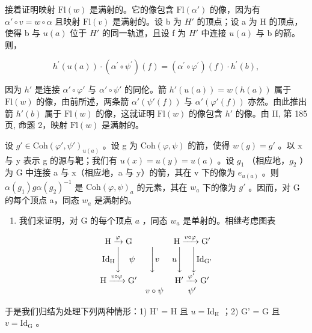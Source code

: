 接着证明映射 \(\mathrm{Fl}(w)\) 是满射的。它的像包含 \(\mathrm{Fl}(\alpha')\) 的像，因为有 \(\alpha'\circ v=w\circ\alpha\) 且映射 \(\mathrm{Fl}(v)\) 是满射的。设 b 为 \(H'\) 的顶点；设 a 为 H 的顶点，使得 b 与 \(u(a)\) 位于 \(H'\) 的同一轨道，且设 f 为 \(H'\) 中连接 \(u(a)\) 与 b 的箭。则，

\[
h ^ {\prime} (u (a)) \cdot (\alpha^ {\prime} \circ \psi^ {\prime}) (f) = (\alpha^ {\prime} \circ \varphi^ {\prime}) (f) \cdot h ^ {\prime} (b),
\]

因为 \(h'\) 是连接 \(\alpha' \circ \varphi'\) 与 \(\alpha' \circ \psi'\) 的同伦。箭 \(h'(u(a)) = w(h(a))\) 属于 \(\mathrm{Fl}(w)\) 的像，由前所述，两条箭 \(\alpha'(\psi'(f))\) 与 \(\alpha'(\varphi'(f))\) 亦然。由此推出箭 \(h'(b)\) 属于 \(\mathrm{Fl}(w)\) 的像，这就证明 \(\mathrm{Fl}(w)\) 的像包含 \(h'\) 的像。由 II, 第 185 页, 命题 2，映射 \(\mathrm{Fl}(w)\) 是满射的。

设 \(g' \in \mathrm{Coh}(\varphi', \psi')_{u(a)}\) 。设 g 为 \(\mathrm{Coh}(\varphi, \psi)\) 的箭，使得 \(w(g) = g'\) 。以 x 与 y 表示 g 的源与靶；我们有 \(u(x) = u(y) = u(a)\) 。设 \(g_1\) （相应地，\(g_2\) ）为 G 中连接 a 与 x（相应地，a 与 y）的箭，其在 v 下的像为 \(e_{u(a)}\) 。则 \(\alpha(g_1)g\alpha(g_2)^{-1}\) 是 \(\mathrm{Coh}(\varphi, \psi)_a\) 的元素，其在 \(w_a\) 下的像为 \(g'\) 。因而，对 G 的每个顶点 a，同态 \(w_a\) 是满射的。

\begin{enumerate}
\def\labelenumi{\alph{enumi})}
\setcounter{enumi}{2}
\tightlist
\item
  我们来证明，对 G 的每个顶点 \(a\) ，同态 \(w_{a}\) 是单射的。相继考虑图表
\end{enumerate}

\[
\begin{array}{c c c} \mathrm{H} \xrightarrow {\varphi} \mathrm{G} & & \mathrm{H} \xrightarrow {v \circ \varphi} \mathrm{G} ^ {\prime} \\ \mathrm{Id} _ {\mathrm{H}} \Biggl \downarrow \quad \psi & \Biggl \downarrow v & u \Biggl \downarrow \quad \Biggl \downarrow \mathrm{Id} _ {\mathrm{G} ^ {\prime}} \\ \mathrm{H} \xrightarrow {v \circ \varphi} \mathrm{G} ^ {\prime} & & \mathrm{H} ^ {\prime} \xrightarrow {\varphi^ {\prime}} \mathrm{G} ^ {\prime} \\ & v \circ \psi & \psi^ {\prime} \end{array}
\]

于是我们归结为处理下列两种情形：1) H' = H 且 \(u = \mathrm{Id}_{\mathrm{H}}\) ；2) G' = G 且 \(v = \mathrm{Id}_{\mathrm{G}}\) 。

